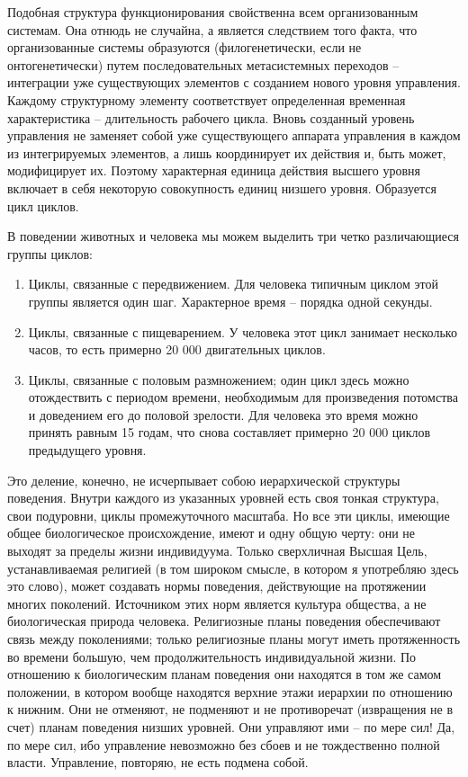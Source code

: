 \documentclass{book}
\begin{document}
Подобная структура функционирования свойственна всем организованным системам. Она отнюдь не случайна, а являет­ся следствием того факта, что организованные системы образуются (филогенетически, если не онтогенетически) путем последовательных метасистемных переходов -- интеграции уже существующих элементов с созданием нового уровня управления. Каждому структурному элементу соответствует определенная временная характеристика -- длительность рабочего цик­ла. Вновь созданный уровень управления не заменяет собой уже существующего аппарата управления в каждом из интегрируемых элементов, а лишь координирует их действия и, быть может, модифицирует их. Поэтому характерная единица действия высшего уровня включает в себя некоторую совокуп­ность единиц низшего уровня. Образуется цикл циклов. 

В поведении животных и человека мы можем выделить три четко различающиеся группы циклов:
\begin{enumerate}
 \item Циклы, связанные с передвижением. Для человека типич­ным циклом этой группы является один шаг. Характерное время -- порядка одной секунды.
 \item Циклы, связанные с пищеварением. У человека этот цикл занимает несколько часов, то есть примерно 20 000 двигатель­ных циклов.
 \item Циклы, связанные с половым размножением; один цикл здесь можно отождествить с периодом времени, необходимым для произведения потомства и доведением его до половой зрелости. Для человека это время можно принять равным 15 годам, что снова составляет примерно 20 000 циклов преды­дущего уровня.
\end{enumerate}

Это деление, конечно, не исчерпывает собою иерархической структуры поведения. Внутри каждого из указанных уровней есть своя тонкая структура, свои подуровни, циклы промежуточного масштаба. Но все эти циклы, имеющие общее биоло­гическое происхождение, имеют и одну общую черту: они не выходят за пределы жизни индивидуума. Только сверхличная Высшая Цель, устанавливаемая религией (в том широком смысле, в котором я употребляю здесь это слово), может со­здавать нормы поведения, действующие на протяжении многих поколений. Источником этих норм является культура общества, а не биологическая природа человека. Религиозные планы поведения обеспечивают связь между поколениями; только религиозные планы могут иметь протяженность во времени большую, чем продолжительность индивидуальной жизни. По отношению к биологическим планам поведения они находятся в том же самом положении, в котором вообще находятся верхние этажи иерархии по отношению к нижним. Они не отменяют, не подменяют и не противоречат (извращения не в счет) 
пла­нам поведения низших уровней. Они управляют ими -- по мере сил! Да, по мере сил, ибо управление невозможно без сбоев и не тождественно полной власти. Управление, повторяю, не есть подмена собой.
\end{document}
